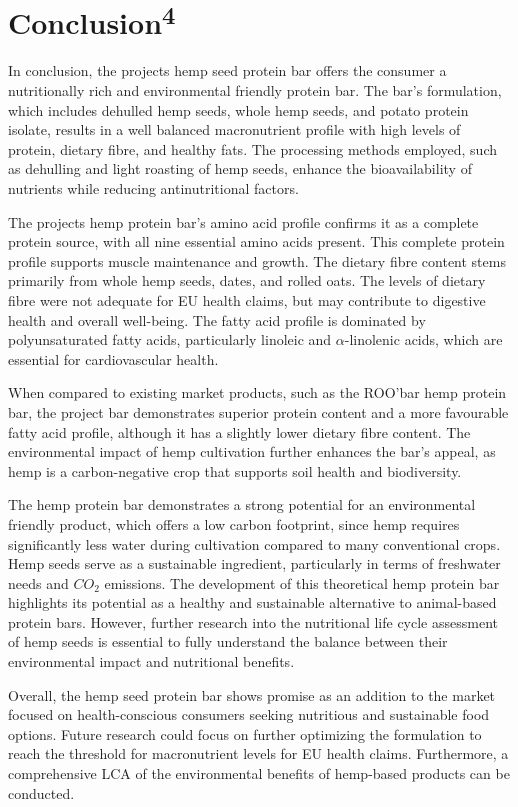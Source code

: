 \section{Conclusion\textsuperscript{4}}
In conclusion, the projects hemp seed protein bar offers the consumer a nutritionally rich and environmental friendly protein bar. The bar's formulation, which includes dehulled hemp seeds, whole hemp seeds, and potato protein isolate, results in a well balanced macronutrient profile with high levels of protein, dietary fibre, and healthy fats. The processing methods employed, such as dehulling and light roasting of hemp seeds, enhance the bioavailability of nutrients while reducing antinutritional factors.


\vspace{1em}
The projects hemp protein bar's amino acid profile confirms it as a complete protein source, with all nine essential amino acids present. This complete protein profile supports muscle maintenance and growth. The dietary fibre content stems primarily from whole hemp seeds, dates, and rolled oats. The levels of dietary fibre were not adequate for EU health claims, but may  contribute to digestive health and overall well-being. The fatty acid profile is dominated by polyunsaturated fatty acids, particularly linoleic and $\alpha$-linolenic acids, which are essential for cardiovascular health.

\vspace{1em}
When compared to existing market products, such as the ROO'bar hemp protein bar, the project bar demonstrates superior protein content and a more favourable fatty acid profile, although it has a slightly lower dietary fibre content. The environmental impact of hemp cultivation further enhances the bar's appeal, as hemp is a carbon-negative crop that supports soil health and biodiversity.

\vspace{1em}
The hemp protein bar demonstrates a strong potential for an environmental friendly product, which offers a low carbon footprint, since hemp requires significantly less water during cultivation compared to many conventional crops. Hemp seeds serve as a sustainable ingredient, particularly in terms of freshwater needs and $CO_2$ emissions. The development of this theoretical hemp protein bar highlights its potential as a healthy and sustainable alternative to animal-based protein bars. However, further research into the nutritional life cycle assessment of hemp seeds is essential to fully understand the balance between their environmental impact and nutritional benefits.

\vspace{1em}
Overall, the hemp seed protein bar shows promise as an addition to the market focused on health-conscious consumers seeking nutritious and sustainable food options. Future research could focus on further optimizing the formulation to reach the threshold for macronutrient levels for EU health claims. Furthermore, a comprehensive LCA of the environmental benefits of hemp-based products can be conducted.

